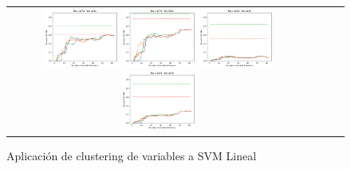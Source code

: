 \begin{figure}[h!]
\begin{tabular}{cccc}
\includegraphics[width=0.25\textwidth]{Kap5/linear_ALL_LINKAGES_train=b278test=b234.png}  \includegraphics[width=0.25\textwidth]{Kap5/linear_ALL_LINKAGES_train=b278test=b261.png} 
 \includegraphics[width=0.25\textwidth]{Kap5/linear_ALL_LINKAGES_train=b360test=b234.png}  \includegraphics[width=0.25\textwidth]{Kap5/linear_ALL_LINKAGES_train=b360test=b278.png} 
\end{tabular}
\caption{Aplicación de clustering de variables a SVM Lineal}
\label{fig:agg_l}
\end{figure}

